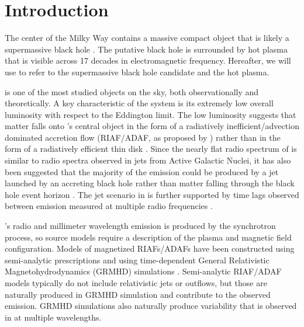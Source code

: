 \section{Introduction}
\label{sec:intro}

The center of the Milky Way contains a massive compact object that is likely a supermassive black hole \citep{2019Sci...365..664D, 2019A&A...625L..10G}.
The putative black hole is surrounded by hot plasma that is visible across 17 decades in electromagnetic frequency.
Hereafter, we will use \sgra to refer to the supermassive black hole candidate and the hot plasma.

\sgra is one of the most studied objects on the sky, both observationally and theoretically.
A key  characteristic of the \sgra system is its extremely low overall luminosity with respect to the Eddington limit.
The low luminosity suggests that matter falls onto \sgra's central object in the form of a radiatively inefficient/advection dominated accretion flow (RIAF/ADAF, as proposed by \citealt{1977ApJ...214..840I,1994ApJ...428L..13N, 1995ApJ...444..231N, 1995ApJ...452..710N, 1996A&AS..120C.287N, 1998ApJ...492..554N,2014ARA&A..52..529Y}) rather than in the form of a radiatively efficient thin disk \citep{1973A&A....24..337S}.
Since the nearly flat radio spectrum of \sgra is similar to radio spectra observed in jets from Active Galactic Nuclei, it has also been suggested that the majority of the \sgra emission could be produced by a jet launched by an accreting black hole rather than matter falling through the black hole event horizon \citep{1993A&A...278L...1F, 2000A&A...362..113F}.
The jet scenario in \sgra is further supported by time lags observed between emission measured at multiple radio frequencies \citep{2021arXiv210713402B}.

\sgra's radio and millimeter wavelength emission is produced by the  synchrotron process, so source models require a description of the plasma and magnetic field configuration.
Models of magnetized RIAFs/ADAFs have been constructed using semi-analytic prescriptions \citep[e.g.,][]{1995Natur.374..623N,2000ApJ...541..234O, 2009ApJ...697...45B,2011ApJ...735..110B} and using time-dependent General Relativistic Magnetohydrodynamics (GRMHD) simulations \citep[e.g.,][]{2000ApJ...528..462H, 2003ApJ...589..458D, 2003ApJ...589..444G, 2007CQGra..24S.235G, 2012ApJS..201....9F, 2014ApJ...796...22F, 2016ApJS..225...22W, 2017ApJS..231...17A, 2018JPhCS1031a2008O, Olivares2019, 2019ApJS..243...26P}.
Semi-analytic RIAF/ADAF models typically do not include relativistic jets or outflows, but those are naturally produced in GRMHD simulation and contribute to the observed emission.
GRMHD simulations also naturally produce variability that is observed in \sgra at multiple wavelengths.

